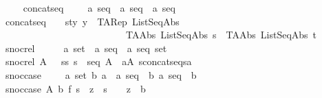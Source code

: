 \begin{isabellebody}
\ \ \ \isanewline
\isanewline
\isanewline
\isanewline
\isanewline
\ \ concatseq\ \ \ \ {\isacharcolon}{\isacharcolon}\ {\isachardoublequoteopen}{\isacharparenleft}{\isacharprime}a\ seq\ {\isacharasterisk}\ {\isacharprime}a\ seq{\isacharparenright}\ {\isacharless}{\isacharequal}{\isachargreater}\ {\isacharprime}a\ seq{\isachardoublequoteclose}\isanewline
\ \ {\isachardoublequoteopen}concatseq\ \ \ {\isacharequal}{\isacharequal}\ {\isacharbraceleft}{\isacharparenleft}{\isacharparenleft}s{\isacharcomma}t{\isacharparenright}{\isacharcomma}y{\isacharparenright}{\isachardot}\ y\ {\isacharequal}\ TARep\ ListSeqAbs\ \isanewline
\ \ \ \ \ \ \ \ \ \ \ \ \ \ \ \ \ \ \ \ \ \ \ \ \ \ \ {\isacharparenleft}{\isacharparenleft}TAAbs\ ListSeqAbs\ s{\isacharparenright}\ {\isacharat}\ {\isacharparenleft}TAAbs\ ListSeqAbs\ t{\isacharparenright}{\isacharparenright}{\isacharbraceright}{\isachardoublequoteclose}\ \ \ \isanewline
\isanewline
\ \ snoc{\isacharunderscore}rel\ \ \ \ \ {\isacharcolon}{\isacharcolon}\ {\isachardoublequoteopen}{\isacharprime}a\ set\ {\isacharequal}{\isachargreater}\ {\isacharparenleft}{\isacharprime}a\ seq\ {\isacharasterisk}\ {\isacharprime}a\ seq{\isacharparenright}\ set{\isachardoublequoteclose}\isanewline
\ \ {\isachardoublequoteopen}snoc{\isacharunderscore}rel\ A\ \ {\isacharequal}{\isacharequal}\ {\isacharbraceleft}{\isacharparenleft}s{\isacharcomma}s{\isacharprime}{\isacharparenright}{\isachardot}\ s\ {\isacharcolon}\ seq\ A\ {\isacharampersand}{\isacharparenleft}{\isacharquery}\ a{\isacharcolon}A{\isachardot}\ s{\isacharprime}{\isacharequal}concatseq{\isacharpercent}{\isacharcircum}{\isacharparenleft}s{\isacharcomma}{\isacharpercent}{\isacharless}a{\isacharpercent}{\isachargreater}{\isacharparenright}{\isacharparenright}{\isacharbraceright}{\isachardoublequoteclose}\isanewline
\isanewline
\ \ snoc{\isacharunderscore}case\ \ \ \ {\isacharcolon}{\isacharcolon}\ {\isachardoublequoteopen}{\isacharbrackleft}{\isacharprime}a\ set{\isacharcomma}\ {\isacharprime}b{\isacharcomma}\ {\isacharparenleft}{\isacharprime}a\ {\isacharequal}{\isachargreater}\ {\isacharprime}a\ seq\ {\isacharequal}{\isachargreater}\ {\isacharprime}b{\isacharparenright}{\isacharcomma}\ {\isacharprime}a\ seq{\isacharbrackright}\ {\isacharequal}{\isachargreater}\ {\isacharprime}b{\isachardoublequoteclose}\isanewline
\ \ {\isachardoublequoteopen}snoc{\isacharunderscore}case\ A\ b\ f\ s\ {\isacharequal}{\isacharequal}\ {\isacharat}z{\isachardot}\ \ {\isacharparenleft}s\ {\isacharequal}\ {\isacharpercent}{\isacharless}{\isacharpercent}{\isachargreater}\ {\isacharminus}{\isacharminus}{\isachargreater}\ z\ {\isacharequal}\ b{\isacharparenright}\ \ {\isacharampersand}\ \isanewline

\end{isabellebody}

